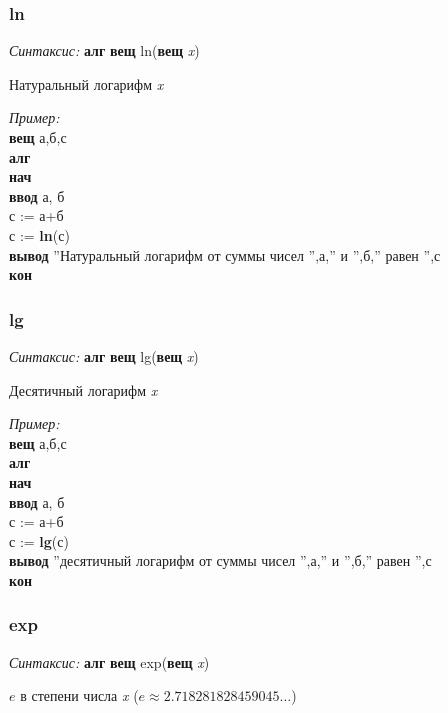 \normalfont
\subsubsection{ln}

\emph{Синтаксис:} \textbf{алг} \textbf{вещ} ln(\textbf{вещ} \emph{x})


     
 
		Натуральный логарифм \emph{x}
      
\emph{Пример:}  
\sffamily
~\\\textbf{вещ} а,б,с
~\\\textbf{алг
~\\нач
~\\\otstup ввод} а, б
~\\\otstup с := а+б
~\\\otstup с := \textbf{ln}(с)
~\\\otstup \textbf{вывод} ''Натуральный логарифм от суммы чисел '',а,'' и '',б,'' равен '',с
~\\\textbf{кон} 

\normalfont
\subsubsection{lg}

\emph{Синтаксис:} \textbf{алг} \textbf{вещ} lg(\textbf{вещ} \emph{x})


     
 
		Десятичный логарифм \emph{x}
      
\emph{Пример:}  
\sffamily
~\\\textbf{вещ} а,б,с
~\\\textbf{алг
~\\нач
~\\\otstup ввод} а, б
~\\\otstup с := а+б
~\\\otstup с := \textbf{lg}(с)
~\\\otstup \textbf{вывод} ''десятичный логарифм от суммы чисел '',а,'' и '',б,'' равен '',с
~\\\textbf{кон} 

\normalfont
\subsubsection{exp}

\emph{Синтаксис:} \textbf{алг} \textbf{вещ} exp(\textbf{вещ} \emph{x})


$e$ в степени числа \emph{x} ($e\approx 2.718281828459045\dots$)
      
